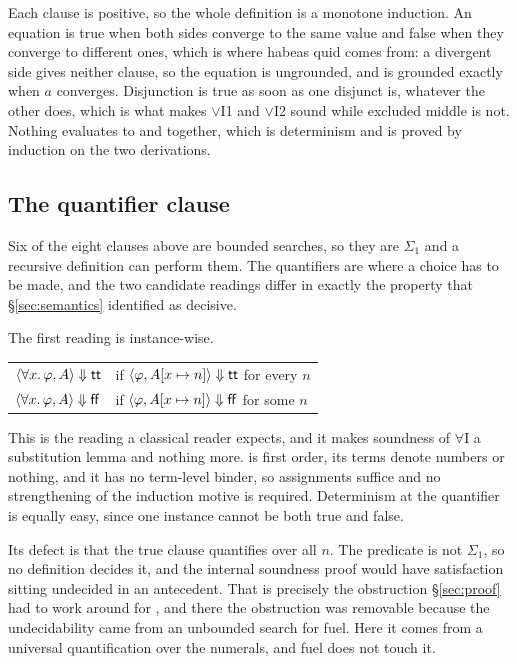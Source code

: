 \noindent
Each clause is positive, so the whole definition is a monotone induction.  An
equation is true when both sides converge to the same value and false when they
converge to different ones, which is where habeas quid comes from: a divergent
side gives neither clause, so the equation is ungrounded, and  is
grounded exactly when $a$ converges.  Disjunction is true as soon as one disjunct
is, whatever the other does, which is what makes $\vee$I1 and $\vee$I2 sound
while excluded middle is not.  Nothing evaluates to  and  together,
which is determinism and is proved by induction on the two derivations.

\subsection{The quantifier clause}
\label{sec:semantics:quant}

Six of the eight clauses above are bounded searches, so they are $\Sigma_1$ and a
\QGA{} recursive definition can perform them.  The quantifiers are where a choice
has to be made, and the two candidate readings differ in exactly the property
that \S\ref{sec:semantics} identified as decisive.

The first reading is instance-wise.

\begin{center}
\begin{tabular}{@{}ll@{}}
$\langle \forall x.\,\varphi, A\rangle \Downarrow \mathsf{tt}$ &
  if $\langle \varphi, A[x \mapsto n]\rangle \Downarrow \mathsf{tt}$ for every $n$\\
$\langle \forall x.\,\varphi, A\rangle \Downarrow \mathsf{ff}$ &
  if $\langle \varphi, A[x \mapsto n]\rangle \Downarrow \mathsf{ff}$ for some $n$\\
\end{tabular}
\end{center}

\noindent
This is the reading a classical reader expects, and it makes soundness of
$\forall$I a substitution lemma and nothing more.  \QGA{} is first order, its
terms denote numbers or nothing, and it has no term-level binder, so assignments
suffice and no strengthening of the induction motive is required.  Determinism at
the quantifier is equally easy, since one instance cannot be both true and false.

Its defect is that the true clause quantifies over all $n$.  The predicate is not
$\Sigma_1$, so no \QGA{} definition decides it, and the internal soundness proof
would have satisfaction sitting undecided in an antecedent.  That is precisely
the obstruction \S\ref{sec:proof} had to work around for \BGA, and there the
obstruction was removable because the undecidability came from an unbounded
search for fuel.  Here it comes from a universal quantification over the
numerals, and fuel does not touch it.

